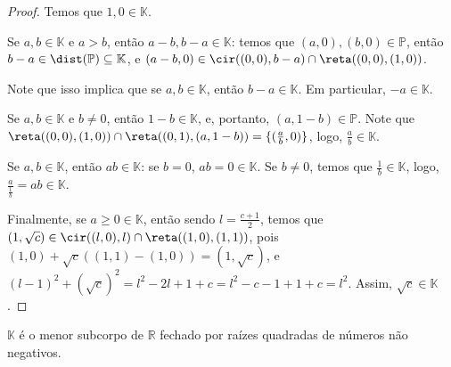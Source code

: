 \begin{proof}
    Temos que $1, 0 \in \mathbb K$.

    Se $a, b \in \mathbb K$ e $a>b$, então $a-b, b-a \in \mathbb K$: temos que $(a, 0), (b, 0) \in \mathbb P$, então $b-a \in \dist(\mathbb P)\subseteq \mathbb K$, e $(a-b, 0) \in \cir((0, 0), b-a)\cap \reta((0, 0), (1, 0))$.

    Note que isso implica que se $a, b \in \mathbb K$, então $b-a\in \mathbb K$. Em particular, $-a \in \mathbb K$.

    Se $a, b \in \mathbb K$ e $b\neq 0$, então $1-b \in \mathbb K$, e, portanto, $(a, 1-b)\in \mathbb P$. Note que $\reta((0, 0), (1, 0))\cap \reta((0, 1), (a, 1-b))=\{(\frac ab, 0)\}$, logo, $\frac ab \in \mathbb K$.

    Se $a, b \in \mathbb K$, então $ab \in \mathbb K$: se $b=0$, $ab=0\in \mathbb K$. Se $b\neq 0$, temos que $\frac 1b\in \mathbb K$, logo, $\frac{a}{\frac1b}=ab\in \mathbb K$.

    Finalmente, se $a\geq 0  \in \mathbb K$, então sendo $l=\frac{c+1}{2}$, temos que $(1, \sqrt c)\in \cir((l, 0), l)\cap \reta((1, 0), (1, 1))$, pois $(1, 0)+\sqrt c((1, 1)-(1, 0))=(1, \sqrt c)$, e $(l-1)^2+(\sqrt c)^2=l^2-2l+1+c=l^2-c-1+1+c=l^2$. Assim, $\sqrt c \in \mathbb K$.
\end{proof}
\begin{prop}
    $\mathbb K$ é o menor subcorpo de $\mathbb R$ fechado por raízes quadradas de números não negativos.
\end{prop}
